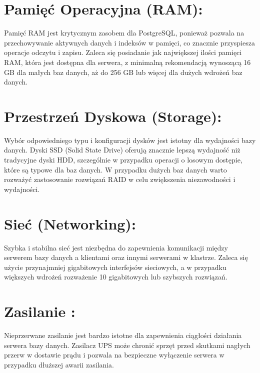 \documentclass[letterpaper,10pt,polish]{sphinxmanual}
\begin{document}
\section{Pamięć Operacyjna (RAM):}
\label{\detokenize{DB-Report/Bazy Danych Rozdzia_u0142 1/Pod_rozdzia_u0142_1:pamiec-operacyjna-ram}}
\sphinxAtStartPar
Pamięć RAM jest krytycznym zasobem dla PostgreSQL, ponieważ pozwala na przechowywanie aktywnych danych i indeksów w pamięci, co znacznie przyspiesza operacje odczytu i zapisu. Zaleca się posiadanie jak największej ilości pamięci RAM, która jest dostępna dla serwera, z minimalną rekomendacją wynoszącą 16 GB dla małych baz danych, aż do 256 GB lub więcej dla dużych wdrożeń baz danych.


\section{Przestrzeń Dyskowa (Storage):}
\label{\detokenize{DB-Report/Bazy Danych Rozdzia_u0142 1/Pod_rozdzia_u0142_1:przestrzen-dyskowa-storage}}
\sphinxAtStartPar
Wybór odpowiedniego typu i konfiguracji dysków jest istotny dla wydajności bazy danych. Dyski SSD (Solid State Drive) oferują znacznie lepszą wydajność niż tradycyjne dyski HDD, szczególnie w przypadku operacji o losowym dostępie, które są typowe dla baz danych. W przypadku dużych baz danych warto rozważyć zastosowanie rozwiązań RAID w celu zwiększenia niezawodności i wydajności.


\section{Sieć (Networking):}
\label{\detokenize{DB-Report/Bazy Danych Rozdzia_u0142 1/Pod_rozdzia_u0142_1:siec-networking}}
\sphinxAtStartPar
Szybka i stabilna sieć jest niezbędna do zapewnienia komunikacji między serwerem bazy danych a klientami oraz innymi serwerami w klastrze. Zaleca się użycie przynajmniej gigabitowych interfejsów sieciowych, a w przypadku większych wdrożeń rozważenie 10 gigabitowych lub szybszych rozwiązań.


\section{Zasilanie :}
\label{\detokenize{DB-Report/Bazy Danych Rozdzia_u0142 1/Pod_rozdzia_u0142_1:zasilanie}}
\sphinxAtStartPar
Nieprzerwane zasilanie jest bardzo istotne dla zapewnienia ciągłości działania serwera bazy danych. Zasilacz UPS może chronić sprzęt przed skutkami nagłych przerw w dostawie prądu i pozwala na bezpieczne wyłączenie serwera w przypadku dłuższej awarii zasilania.
\end{document}
